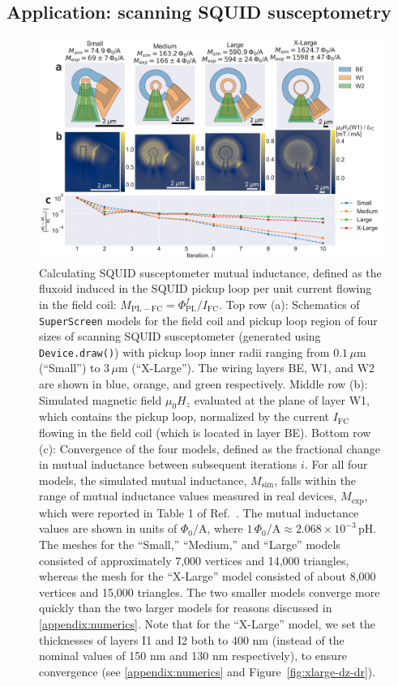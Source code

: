 \documentclass[final,3p,times,twocolumn]{elsarticle}
\newcommand{\inline}[1]{\texttt{#1}\xspace}
\newcommand{\SuperScreen}{\inline{SuperScreen}}
\newcommand{\um}{\mu\mathrm{m}}
\begin{document}
\subsection{Application: scanning SQUID susceptometry}
\label{section:examples:scanning-squid}

\begin{figure}[t]
    \centering
    \includegraphics[width=\textwidth]{examples/images/squid-mutuals.pdf}
    \caption{Calculating SQUID susceptometer mutual inductance, defined as the fluxoid induced in the SQUID pickup loop per unit current flowing in the field coil: $M_\mathrm{PL-FC}=\Phi^f_\mathrm{PL} / I_\mathrm{FC}$. Top row (a): Schematics of \SuperScreen models for the field coil and pickup loop region of four sizes of scanning SQUID susceptometer (generated using \inline{Device.draw()}) with pickup loop inner radii ranging from $0.1\,\um$ (``Small'') to $3\,\um$ (``X-Large''). The wiring layers BE, W1, and W2 are shown in blue, orange, and green respectively. Middle row (b): Simulated magnetic field $\mu_0H_z$ evaluated at the plane of layer W1, which contains the pickup loop, normalized by the current $I_\mathrm{FC}$ flowing in the field coil (which is located in layer BE). Bottom row (c): Convergence of the four models, defined as the fractional change in mutual inductance between subsequent iterations $i$. For all four models, the simulated mutual inductance, $M_\mathrm{sim}$, falls within the range of mutual inductance values measured in real devices, $M_\mathrm{exp}$, which were reported in Table 1 of Ref.~\cite{Kirtley2016-zz}. The mutual inductance values are shown in units of $\Phi_0 / \mathrm{A}$, where $1\,\Phi_0 / \mathrm{A}\approx2.068\times10^{-3}\,\mathrm{pH}$. The meshes for the ``Small,'' ``Medium,'' and ``Large'' models consisted of approximately 7,000 vertices and 14,000 triangles, whereas the mesh for the ``X-Large'' model consisted of about 8,000 vertices and 15,000 triangles. The two smaller models converge more quickly than the two larger models for reasons discussed in \ref{appendix:numerics}. Note that for the ``X-Large'' model, we set the thicknesses of layers I1 and I2 both to 400 nm (instead of the nominal values of 150 nm and 130 nm respectively), to ensure convergence (see \ref{appendix:numerics} and Figure~\ref{fig:xlarge-dz-dr}).}
    \label{fig:squid-mutuals}
\end{figure}
\end{document}
